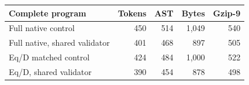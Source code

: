 \begin{tabular}{@{}lrrrr@{}}
\toprule
Complete program & Tokens & AST & Bytes & Gzip-9\\
\midrule
Full native control & 450 & 514 & 1,049 & 540\\
Full native, shared validator & 401 & 468 & 897 & 505\\
Eq/D matched control & 424 & 484 & 1,000 & 522\\
Eq/D, shared validator & 390 & 454 & 878 & 498\\
\bottomrule
\end{tabular}
